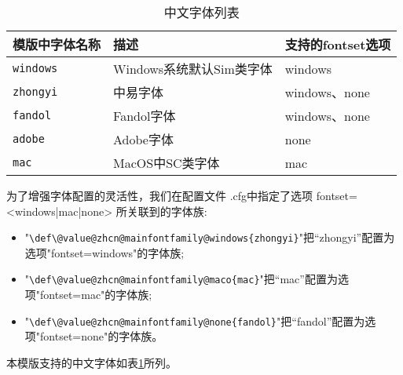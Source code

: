 \begin{table}[!htbp]
    \caption{中文字体列表}
    \label{tab:zhcnfont}
    \centering
    \small%
    \setlength{\tabcolsep}{4pt}%
    \renewcommand{\arraystretch}{1.2}%
    \begin{tabular}{lll}
        \toprule
         模版中字体名称 & 描述 &支持的fontset选项 \\
        \midrule
        \texttt{windows} & Windows系统默认Sim类字体 & windows  \\
        \texttt{zhongyi} & 中易字体 & windows、none \\
        \texttt{fandol}  & Fandol字体 & windows、none \\
        \texttt{adobe} & Adobe字体 & none \\
        \texttt{mac} & MacOS中SC类字体 & mac \\
        \bottomrule
    \end{tabular}
\end{table}

 为了增强字体配置的灵活性，我们在配置文件 \projectname .cfg中指定了选项 fontset=<windows|mac|none> 所关联到的字体族:
\begin{itemize}
\item "\texttt{\backslash def\backslash \projectname @value@zhcn@mainfontfamily@windows\{zhongyi\}}"把“zhongyi”配置为选项"fontset=windows"的字体族;
\item "\texttt{\backslash def\backslash \projectname @value@zhcn@mainfontfamily@maco\{mac\}}"把“mac”配置为选项"fontset=mac"的字体族;
\item "\texttt{\backslash def\backslash \projectname @value@zhcn@mainfontfamily@none\{fandol\}}"把“fandol”配置为选项"fontset=none"的字体族。
\end{itemize}

本模版支持的中文字体如表\ref{tab:zhcnfont}所列。




